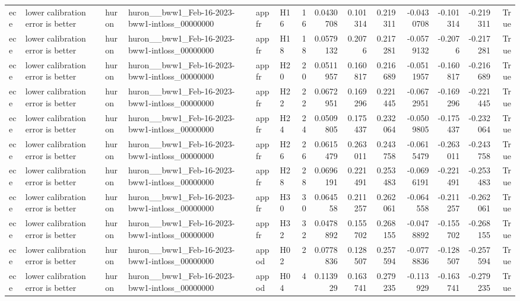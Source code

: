 \begin{longtable}{llllllrrrrrrrr}
ece & lower calibration error is better & huron & huron\_\_bww1\_Feb-16-2023-bww1-intloss\_00000000 & appfr & H16 & 16 & 0.0430708 & 0.101314 & 0.219311 & -0.0430708 & -0.101314 & -0.219311 & True \\
ece & lower calibration error is better & huron & huron\_\_bww1\_Feb-16-2023-bww1-intloss\_00000000 & appfr & H18 & 18 & 0.0579132 & 0.2076 & 0.217281 & -0.0579132 & -0.2076 & -0.217281 & True \\
ece & lower calibration error is better & huron & huron\_\_bww1\_Feb-16-2023-bww1-intloss\_00000000 & appfr & H20 & 20 & 0.0511957 & 0.160817 & 0.216689 & -0.0511957 & -0.160817 & -0.216689 & True \\
ece & lower calibration error is better & huron & huron\_\_bww1\_Feb-16-2023-bww1-intloss\_00000000 & appfr & H22 & 22 & 0.0672951 & 0.169296 & 0.221445 & -0.0672951 & -0.169296 & -0.221445 & True \\
ece & lower calibration error is better & huron & huron\_\_bww1\_Feb-16-2023-bww1-intloss\_00000000 & appfr & H24 & 24 & 0.0509805 & 0.175437 & 0.232064 & -0.0509805 & -0.175437 & -0.232064 & True \\
ece & lower calibration error is better & huron & huron\_\_bww1\_Feb-16-2023-bww1-intloss\_00000000 & appfr & H26 & 26 & 0.0615479 & 0.263011 & 0.243758 & -0.0615479 & -0.263011 & -0.243758 & True \\
ece & lower calibration error is better & huron & huron\_\_bww1\_Feb-16-2023-bww1-intloss\_00000000 & appfr & H28 & 28 & 0.0696191 & 0.221491 & 0.253483 & -0.0696191 & -0.221491 & -0.253483 & True \\
ece & lower calibration error is better & huron & huron\_\_bww1\_Feb-16-2023-bww1-intloss\_00000000 & appfr & H30 & 30 & 0.064558 & 0.211257 & 0.262061 & -0.064558 & -0.211257 & -0.262061 & True \\
ece & lower calibration error is better & huron & huron\_\_bww1\_Feb-16-2023-bww1-intloss\_00000000 & appfr & H32 & 32 & 0.0478892 & 0.155702 & 0.268155 & -0.0478892 & -0.155702 & -0.268155 & True \\
ece & lower calibration error is better & huron & huron\_\_bww1\_Feb-16-2023-bww1-intloss\_00000000 & appod & H02 & 2 & 0.0778836 & 0.128507 & 0.257594 & -0.0778836 & -0.128507 & -0.257594 & True \\
ece & lower calibration error is better & huron & huron\_\_bww1\_Feb-16-2023-bww1-intloss\_00000000 & appod & H04 & 4 & 0.113929 & 0.163741 & 0.279235 & -0.113929 & -0.163741 & -0.279235 & True \\

\end{longtable}

